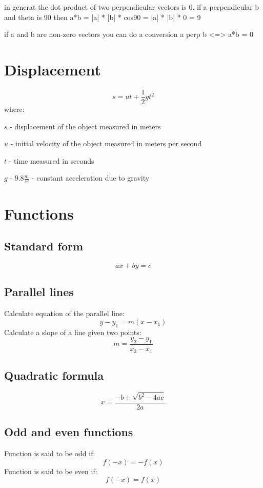 \documentclass{article}
\begin{document}
in generat the dot product of two perpendicular vectors is 0. if a perpendicular b and theta is 90 then
a*b = |a| * |b| * cos90 = |a| * |b| * 0 = 9

if a and b are non-zero vectors you can do a conversion
a perp b <=> a*b = 0

\section{Displacement}
\begin{equation}
  s = ut+\frac{1}{2}gt^2
\end{equation}
where:

$s$ - displacement of the object measured in meters

$u$ - initial velocity of the object measured in meters per second

$t$ - time measured in seconds

$g$ - $9.8\frac{m}{s^2}$ - constant acceleration due to gravity
\section{Functions}
\subsection{Standard form}
\begin{equation}
  ax + by = c
\end{equation}
\subsection{Parallel lines}
Calculate equation of the parallel line:
\begin{equation}
  y - y_1 = m(x - x_1)
\end{equation}
Calculate a slope of a line given two points:
\begin{equation}
  m = \frac{y_2 - y_1}{x_2 - x_1}
\end{equation}
\subsection{Quadratic formula}
\begin{equation}
  x = \frac{-b \pm \sqrt{b^2 - 4ac}}{2a}
\end{equation}

\subsection{Odd and even functions}
Function is said to be odd if:
\begin{equation}
  f(-x) = -f(x)
\end{equation}
Function is said to be even if:
\begin{equation}
  f(-x) = f(x)
\end{equation}
\end{document}
